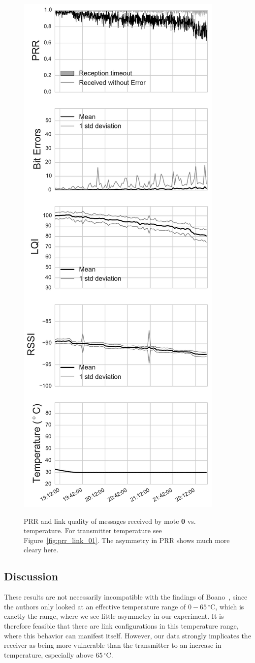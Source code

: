 \begin{figure}[t]
{		\includegraphics[width=0.475\columnwidth]{figures/prr_1-0_transmitter}
		\label{fig:prr_link_10_transmitter}
	}
	\caption{\acs{PRR} and link quality of messages received by mote \textbf{0} vs. temperature.  For transmitter temperature see Figure~\ref{fig:prr_link_01}. The asymmetry in \acs{PRR} shows much more cleary here.}
	\label{fig:prr_link_10}
\end{figure}

\subsection{Discussion}

These results are not necessarily incompatible with the findings of Boano~\etal{}, since the authors only looked at an effective temperature range of $0 - 65\,^{\circ}\mathrm{C}$, which is exactly the range, where we see little asymmetry in our experiment.
It is therefore feasible that there are link configurations in this temperature range, where this behavior can manifest itself.
However, our data strongly implicates the receiver as being more vulnerable than the transmitter to an increase in temperature, especially above $65\,^{\circ}\mathrm{C}$.

